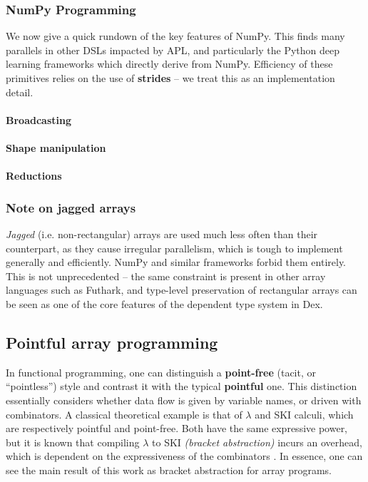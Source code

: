 \subsubsection{NumPy Programming} 

We now give a quick rundown of the key features of NumPy. This finds many parallels in other DSLs impacted by APL, and particularly the Python deep learning frameworks which directly derive from NumPy. Efficiency of these primitives relies on the use of \textbf{strides} \cite{harris2020array} -- we treat this as an implementation detail.

\paragraph{Broadcasting}



\paragraph{Shape manipulation}

\paragraph{Reductions}

\subsubsection{Note on jagged arrays}

\textit{Jagged} (i.e. non-rectangular) arrays are used much less often than their counterpart, as they cause irregular parallelism, which is tough to implement generally and efficiently. NumPy and similar frameworks forbid them entirely. This is not unprecedented -- the same constraint is present in other array languages such as Futhark, and type-level preservation of rectangular arrays can be seen as one of the core features of the dependent type system in Dex.

\subsection{Pointful array programming}

In functional programming, one can distinguish a \textbf{point-free} (tacit, or ``pointless'') style and contrast it with the typical \textbf{pointful} one. This distinction essentially considers whether data flow is given by variable names, or driven with combinators. A classical theoretical example is that of $\lambda$ and SKI calculi, which are respectively pointful and point-free. Both have the same expressive power, but it is known that compiling $\lambda$ to SKI \textit{(bracket abstraction)} incurs an overhead, which is dependent on the expressiveness of the combinators \cite{lachowski2018complexity}. 
In essence, one can see the main result of this work as bracket abstraction for array programs.


